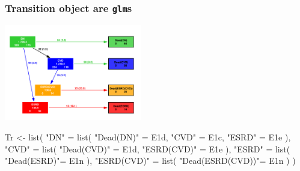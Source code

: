 \begin{frame}[fragile]
   \frametitle{Transition object are \texttt{glm}s}
\vspace*{-1ex}
\includegraphics[width=0.45\textwidth]{./GbAd-states.pdf}
\vspace*{-1ex}
\renewcommand{\baselinestretch}{0.8}
\small
\begin{semiverbatim}
Tr <- list( "DN" = list( "Dead(DN)"  = \alert<2>{E1d},
                         "CVD"       = \alert<3>{E1c},
                         "ESRD"      = \alert<4>{E1e} ),
           "CVD" = list( "Dead(CVD)" = \alert<2>{E1d},
                         "ESRD(CVD)" = \alert<4>{E1e} ),
          "ESRD" = list( "Dead(ESRD)"= \alert<5>{E1n} ),
     "ESRD(CVD)" = list( "Dead(ESRD(CVD))"= \alert<5>{E1n} ) )
\end{semiverbatim}
\normalsize
\renewcommand{\baselinestretch}{1.0}

\end{frame}



